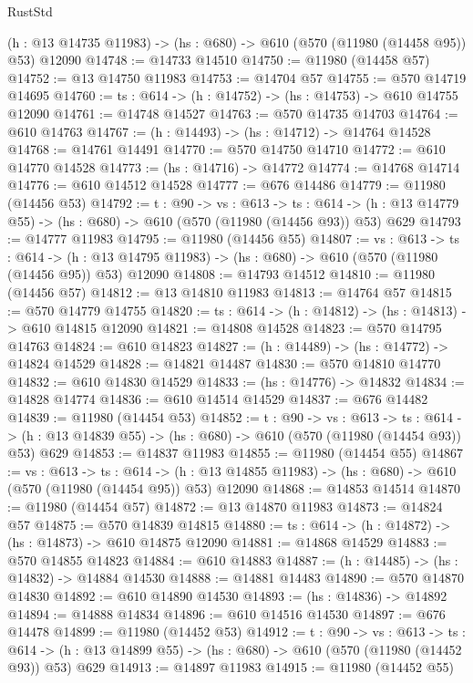 \begin{lexlean}{RustStd}
\begin{coremodule}
  (h : @13 @14735 @11983) -> (hs : @680) -> @610 (@570 (@11980 (@14458 @95)) @53) @12090
@14748 := @14733 @14510
@14750 := @11980 (@14458 @57)
@14752 := @13 @14750 @11983
@14753 := @14704 @57
@14755 := @570 @14719 @14695
@14760 := {ts : @614} -> (h : @14752) -> (hs : @14753) -> @610 @14755 @12090
@14761 := @14748 @14527
@14763 := @570 @14735 @14703
@14764 := @610 @14763
@14767 := (h : @14493) -> (hs : @14712) -> @14764 @14528
@14768 := @14761 @14491
@14770 := @570 @14750 @14710
@14772 := @610 @14770 @14528
@14773 := (hs : @14716) -> @14772
@14774 := @14768 @14714
@14776 := @610 @14512 @14528
@14777 := @676 @14486
@14779 := @11980 (@14456 @53)
@14792 := {t : @90} ->
  {vs : @613} ->
  {ts : @614} -> (h : @13 @14779 @55) -> (hs : @680) -> @610 (@570 (@11980 (@14456 @93)) @53) @629
@14793 := @14777 @11983
@14795 := @11980 (@14456 @55)
@14807 := {vs : @613} ->
  {ts : @614} ->
  (h : @13 @14795 @11983) -> (hs : @680) -> @610 (@570 (@11980 (@14456 @95)) @53) @12090
@14808 := @14793 @14512
@14810 := @11980 (@14456 @57)
@14812 := @13 @14810 @11983
@14813 := @14764 @57
@14815 := @570 @14779 @14755
@14820 := {ts : @614} -> (h : @14812) -> (hs : @14813) -> @610 @14815 @12090
@14821 := @14808 @14528
@14823 := @570 @14795 @14763
@14824 := @610 @14823
@14827 := (h : @14489) -> (hs : @14772) -> @14824 @14529
@14828 := @14821 @14487
@14830 := @570 @14810 @14770
@14832 := @610 @14830 @14529
@14833 := (hs : @14776) -> @14832
@14834 := @14828 @14774
@14836 := @610 @14514 @14529
@14837 := @676 @14482
@14839 := @11980 (@14454 @53)
@14852 := {t : @90} ->
  {vs : @613} ->
  {ts : @614} -> (h : @13 @14839 @55) -> (hs : @680) -> @610 (@570 (@11980 (@14454 @93)) @53) @629
@14853 := @14837 @11983
@14855 := @11980 (@14454 @55)
@14867 := {vs : @613} ->
  {ts : @614} ->
  (h : @13 @14855 @11983) -> (hs : @680) -> @610 (@570 (@11980 (@14454 @95)) @53) @12090
@14868 := @14853 @14514
@14870 := @11980 (@14454 @57)
@14872 := @13 @14870 @11983
@14873 := @14824 @57
@14875 := @570 @14839 @14815
@14880 := {ts : @614} -> (h : @14872) -> (hs : @14873) -> @610 @14875 @12090
@14881 := @14868 @14529
@14883 := @570 @14855 @14823
@14884 := @610 @14883
@14887 := (h : @14485) -> (hs : @14832) -> @14884 @14530
@14888 := @14881 @14483
@14890 := @570 @14870 @14830
@14892 := @610 @14890 @14530
@14893 := (hs : @14836) -> @14892
@14894 := @14888 @14834
@14896 := @610 @14516 @14530
@14897 := @676 @14478
@14899 := @11980 (@14452 @53)
@14912 := {t : @90} ->
  {vs : @613} ->
  {ts : @614} -> (h : @13 @14899 @55) -> (hs : @680) -> @610 (@570 (@11980 (@14452 @93)) @53) @629
@14913 := @14897 @11983
@14915 := @11980 (@14452 @55)

\end{coremodule}
\end{lexlean}
